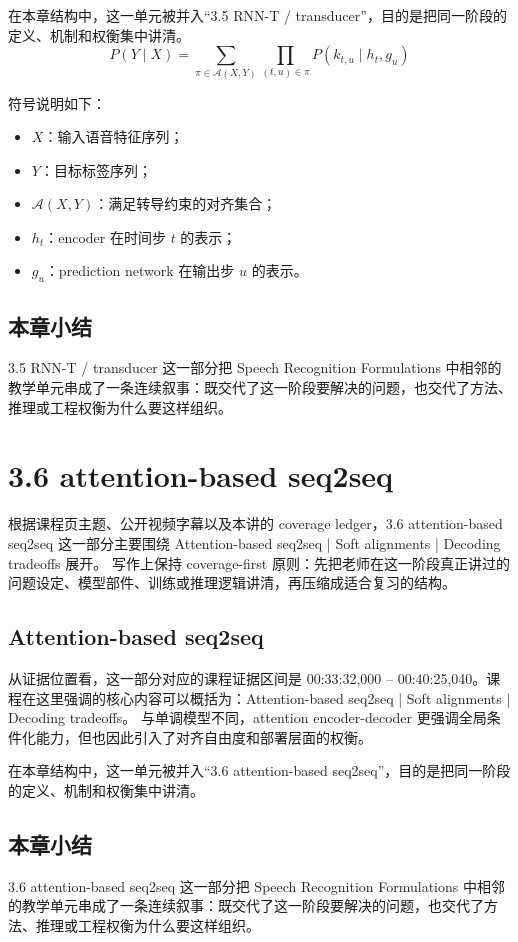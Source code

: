 \documentclass[a4paper]{article}
\begin{document}
在本章结构中，这一单元被并入“3.5 RNN-T / transducer”，目的是把同一阶段的定义、机制和权衡集中讲清。
\[
P(Y \mid X) = \sum_{\pi \in \mathcal{A}(X,Y)} \prod_{(t,u)\in\pi} P(k_{t,u} \mid h_t, g_u)
\]

符号说明如下：
\begin{itemize}
\item $X$：输入语音特征序列；
\item $Y$：目标标签序列；
\item $\mathcal{A}(X,Y)$：满足转导约束的对齐集合；
\item $h_t$：encoder 在时间步 $t$ 的表示；
\item $g_u$：prediction network 在输出步 $u$ 的表示。
\end{itemize}

\subsection{本章小结}
3.5 RNN-T / transducer 这一部分把 Speech Recognition Formulations 中相邻的教学单元串成了一条连续叙事：既交代了这一阶段要解决的问题，也交代了方法、推理或工程权衡为什么要这样组织。

\section{3.6 attention-based seq2seq}
根据课程页主题、公开视频字幕以及本讲的 coverage ledger，3.6 attention-based seq2seq 这一部分主要围绕 Attention-based seq2seq | Soft alignments | Decoding tradeoffs 展开。
写作上保持 coverage-first 原则：先把老师在这一阶段真正讲过的问题设定、模型部件、训练或推理逻辑讲清，再压缩成适合复习的结构。

\subsection{Attention-based seq2seq}
从证据位置看，这一部分对应的课程证据区间是 00:33:32,000 -- 00:40:25,040。课程在这里强调的核心内容可以概括为：Attention-based seq2seq | Soft alignments | Decoding tradeoffs。
与单调模型不同，attention encoder-decoder 更强调全局条件化能力，但也因此引入了对齐自由度和部署层面的权衡。

在本章结构中，这一单元被并入“3.6 attention-based seq2seq”，目的是把同一阶段的定义、机制和权衡集中讲清。

\subsection{本章小结}
3.6 attention-based seq2seq 这一部分把 Speech Recognition Formulations 中相邻的教学单元串成了一条连续叙事：既交代了这一阶段要解决的问题，也交代了方法、推理或工程权衡为什么要这样组织。
\end{document}
